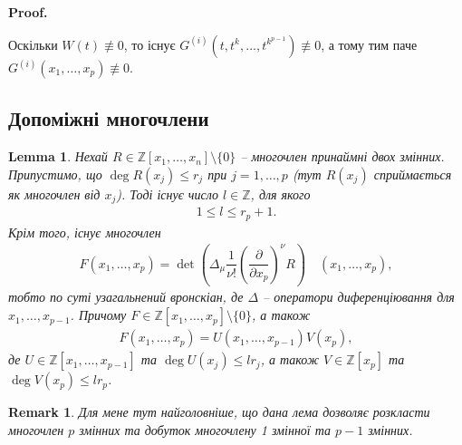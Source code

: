 \documentclass[a4paper, 10pt]{article}
\makeatletter
\theoremstyle{theoremdd}
\theoremstyle{theoremdd}
\theoremstyle{theoremdd}
\theoremstyle{theoremdd}
\theoremstyle{theoremdd}
\theoremstyle{theoremdd}
\theoremstyle{theoremdd}
\theoremstyle{theoremdd}
\theoremstyle{theoremdd}
\theoremstyle{theoremdd}
\theoremstyle{theoremdd}
\newtheorem{remark}[theorem]{Remark}
\theoremstyle{theoremdd}
\theoremstyle{theoremdd}
\newtheorem{lemma}[theorem]{Lemma}
\theoremstyle{theoremdd}
\theoremstyle{theoremdd}
\renewenvironment{proof}[1][Proof.\\]{\par
\pushQED{\hfill \qed}%
\normalfont \topsep6\p@\@plus6\p@\relax
\trivlist
\item\relax
{\bfseries
#1\@addpunct{.}}\hspace\labelsep\ignorespaces
}{%
\popQED\endtrivlist\@endpefalse
}
\makeatother
\begin{document}
\begin{proof}
Оскільки $W(t) \not\equiv 0$, то існує $G^{(i)}(t,t^k,\dots,t^{k^{p-1}}) \not\equiv 0$, а тому тим паче $G^{(i)}(x_1,\dots,x_p) \not\equiv 0$.
\end{proof}

\subsection{Допоміжні многочлени}
\begin{lemma}
\label{decompose_polynomial_n_into_n_minus_one_and_one}
Нехай $R \in \mathbb{Z}[x_1,\dots,x_n] \setminus \{0\}$ -- многочлен принаймні двох змінних. Припустимо, що $\deg R(x_j) \leq r_j$ при $j = 1,\dots,p$ (тут $R(x_j)$ сприймається як многочлен від $x_j$). Тоді існує число $l \in \mathbb{Z}$, для якого
\begin{align*}
1 \leq l \leq r_p +1.
\end{align*}
Крім того, існує многочлен
\begin{align*}
F(x_1,\dots,x_p) = \det \left( \Delta_\mu \dfrac{1}{\nu!} \left( \dfrac{\partial}{\partial x_p}\right)^\nu R\right) \quad (x_1,\dots,x_p),
\end{align*}
тобто по суті узагальнений вронскіан, де $\Delta$ -- оператори диференціювання для $x_1,\dots,x_{p-1}$. Причому $F \in \mathbb{Z}[x_1,\dots,x_p] \setminus \{0\}$, а також
\begin{align*}
F(x_1,\dots,x_p) = U(x_1,\dots,x_{p-1}) V(x_p),
\end{align*}
де $U \in \mathbb{Z}[x_1,\dots,x_{p-1}]$ та $\deg U(x_j) \leq l r_j$, а також $V \in \mathbb{Z}[x_p]$ та $\deg V(x_p) \leq lr_p$.
\end{lemma}

\begin{remark}
Для мене тут найголовніше, що дана лема дозволяє розкласти многочлен $p$ змінних та добуток многочлену 1 змінної та $p-1$ змінних.
\end{remark}
\end{document}

